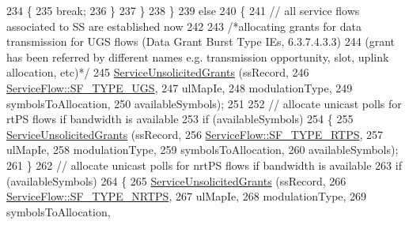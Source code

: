\begin{DoxyCode}
234                     \{
235                       \textcolor{keywordflow}{break};
236                     \}
237                 \}
238             \}
239           \textcolor{keywordflow}{else}
240             \{
241               \textcolor{comment}{// all service flows associated to SS are established now}
242 
243               \textcolor{comment}{/*allocating grants for data transmission for UGS flows (Data Grant Burst Type IEs,
       6.3.7.4.3.3)}
244 \textcolor{comment}{               (grant has been referred by different names e.g. transmission opportunity, slot, uplink
       allocation, etc)*/}
245               \hyperlink{classns3_1_1UplinkSchedulerRtps_ab101ce69266831aad941b4c553d82026}{ServiceUnsolicitedGrants} (ssRecord,
246                                         \hyperlink{classns3_1_1ServiceFlow_a7990ba10be1e098328fd1e6382a26235a969e0b62fa12fef1dbb23913744ed594}{ServiceFlow::SF\_TYPE\_UGS},
247                                         ulMapIe,
248                                         modulationType,
249                                         symbolsToAllocation,
250                                         availableSymbols);
251 
252               \textcolor{comment}{// allocate unicast polls for rtPS flows if bandwidth is available}
253               \textcolor{keywordflow}{if} (availableSymbols)
254                 \{
255                   \hyperlink{classns3_1_1UplinkSchedulerRtps_ab101ce69266831aad941b4c553d82026}{ServiceUnsolicitedGrants} (ssRecord,
256                                             \hyperlink{classns3_1_1ServiceFlow_a7990ba10be1e098328fd1e6382a26235a0e98ff713b932a029acad7e5b24bbf55}{ServiceFlow::SF\_TYPE\_RTPS},
257                                             ulMapIe,
258                                             modulationType,
259                                             symbolsToAllocation,
260                                             availableSymbols);
261                 \}
262               \textcolor{comment}{// allocate unicast polls for nrtPS flows if bandwidth is available}
263               \textcolor{keywordflow}{if} (availableSymbols)
264                 \{
265                   \hyperlink{classns3_1_1UplinkSchedulerRtps_ab101ce69266831aad941b4c553d82026}{ServiceUnsolicitedGrants} (ssRecord,
266                                             \hyperlink{classns3_1_1ServiceFlow_a7990ba10be1e098328fd1e6382a26235a7f8577f851a9f01d159442a3a3fcdf48}{ServiceFlow::SF\_TYPE\_NRTPS},
267                                             ulMapIe,
268                                             modulationType,
269                                             symbolsToAllocation,

\end{DoxyCode}
